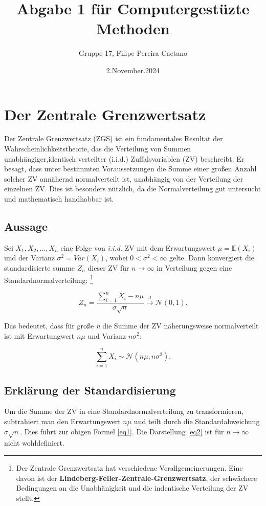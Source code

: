 \documentclass{article}
\title{Abgabe 1 für Computergestüzte Methoden}
\author{Gruppe 17, Filipe Pereira Caetano}
\date{2.November.2024}
\begin{document}
\maketitle
\tableofcontents
\newpage
\section{Der Zentrale Grenzwertsatz}

Der Zentrale Grenzwertsatz (ZGS) ist ein fundamentales Resultat der Wahrscheinlichkeitstheorie, das die Verteilung von Summen unabhängiger,identisch verteilter (i.i.d.) Zuffalsvariablen (ZV) beschreibt. Er besagt, dass unter bestimmten Voraussetzungen die Summe einer großen Anzahl solcher ZV annähernd normalverteilt ist, unabhängig von der Verteilung der einzelnen ZV. Dies ist besonders nützlich, da die Normalverteilung gut untersucht und mathematisch handhabbar ist.

\subsection{Aussage}
Sei $X_1,X_2,...,X_n$ eine Folge von \emph{i.i.d.} ZV mit dem Erwartungswert $\mu =\mathbb{E}(X_i)$ und der Varianz $\sigma^2=Var(X_i)$, wobei $0 < \sigma^2 < \infty$ gelte. Dann konvergiert die standardisierte summe $Z_n$ dieser ZV für $n \to \infty$ in Verteilung gegen eine Standardnormalverteilung: \footnote{Der Zentrale Grenzwertsatz hat verschiedene Verallgemeinerungen. Eine davon ist der \textbf{Lindeberg-Feller-Zentrale-Grenzwertsatz}\cite[Seite 328]{klenke}, der schwächere Bedingungen an die Unabhänigkeit und die indentische Verteilung der ZV stellt.}



\begin{equation}\label{eq1}
    Z_n = \frac{\sum_{i=1}^n X_i-n\mu}{\sigma\sqrt{n}} \xrightarrow{d} \mathcal{N}(0,1).
\end{equation}

Das bedeutet, dass für große \emph{n} die Summe der ZV näherungsweise normalverteilt ist mit Erwartungwert $n\mu$ und Varianz $n\sigma^2$:

\begin{equation}\label{eq2}
    \sum_{i=1}^n X_i\sim \mathcal{N} (n\mu,n\sigma^2).
\end{equation}




\subsection{Erklärung der Standardisierung}
Um die Summe der ZV in eine Standardnormalverteilung zu transformieren, subtrahiert man den Erwartungswert $n\mu$ und teilt durch die Standardabweichung $\sigma\sqrt{n}$. Dies führt zur obigen Formel \eqref{eq1}. Die Darstellung \eqref{eq2} ist für $n \to \infty$ nicht wohldefiniert.
\end{document}
